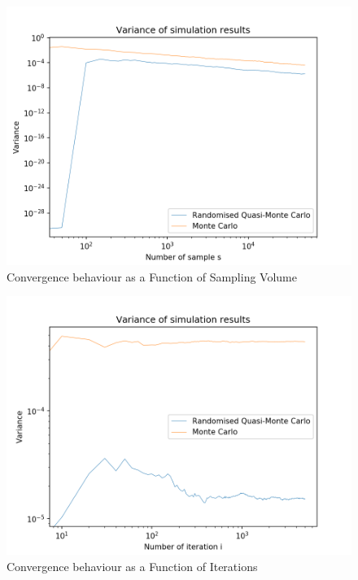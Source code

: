 \documentclass{article}
\begin{document}
    \begin{figure}[!tbp]
        \centering
        \begin{minipage}[b]{0.75\textwidth}
            \includegraphics[width=\textwidth]{pictures/part_4/sampling_q4.png}
            \caption{Convergence behaviour as a Function of Sampling Volume}
            \label{fig:q4sampling}
        \end{minipage}
    \end{figure}

    \begin{figure}[!tbp]
        \centering
        \begin{minipage}[b]{0.75\textwidth}
            \includegraphics[width=\textwidth]{pictures/part_4/iterations_q4.png}
            \caption{Convergence behaviour as a Function of Iterations}
            \label{fig:q4iter}
        \end{minipage}
    \end{figure}
\end{document}
